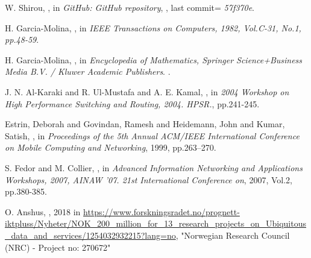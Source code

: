 \documentclass[USenglish]{uit-thesis}
\begin{document}
\begin{thebibliography}{9}
W. Shirou,
,
\newblock in {\em GitHub: GitHub repository},
, last commit={ \textit{57f370e}}.

H. Garcia-Molina,
,
\newblock in {\em IEEE Transactions on Computers, 1982, Vol.C-31, No.1, pp.48-59}.

H. Garcia-Molina,
,
\newblock in {\em  Encyclopedia of Mathematics, Springer Science+Business Media B.V. / Kluwer Academic Publishers}.
.

J. N. Al-Karaki and R. Ul-Mustafa and A. E. Kamal,
,
\newblock in {\em  2004 Workshop on High Performance Switching and Routing, 2004. HPSR.}, pp.241-245.

Estrin, Deborah and Govindan, Ramesh and Heidemann, John and Kumar, Satish,
,
\newblock in {\em Proceedings of the 5th Annual ACM/IEEE International Conference on Mobile Computing and Networking}, 1999, pp.263--270.


S. Fedor and M. Collier,
,
\newblock in {\em Advanced Information Networking and Applications Workshops, 2007, AINAW '07. 21st International Conference on}, 2007, Vol.2, pp.380-385.


O. Anshus,
, 2018
\newblock in {\url{https://www.forskningsradet.no/prognett-iktpluss/Nyheter/NOK_200_million_for_13_research_projects_on_Ubiquitous_data_and_services/1254032932215?lang=no}}, "Norwegian Research Council (NRC) - Project no: 270672"


\end{thebibliography}
\end{document}
